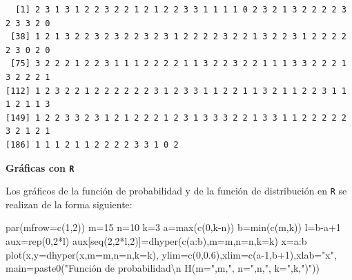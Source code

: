 \documentclass[
  letterpaper,
  DIV=11,
  numbers=noendperiod]{scrreprt}
\newenvironment{Shaded}{\begin{snugshade}}{\end{snugshade}}
\newcommand{\AttributeTok}[1]{\textcolor[rgb]{0.40,0.45,0.13}{#1}}
\newcommand{\DecValTok}[1]{\textcolor[rgb]{0.68,0.00,0.00}{#1}}
\newcommand{\FloatTok}[1]{\textcolor[rgb]{0.68,0.00,0.00}{#1}}
\newcommand{\FunctionTok}[1]{\textcolor[rgb]{0.28,0.35,0.67}{#1}}
\newcommand{\NormalTok}[1]{\textcolor[rgb]{0.00,0.23,0.31}{#1}}
\newcommand{\OtherTok}[1]{\textcolor[rgb]{0.00,0.23,0.31}{#1}}
\newcommand{\SpecialCharTok}[1]{\textcolor[rgb]{0.37,0.37,0.37}{#1}}
\newcommand{\StringTok}[1]{\textcolor[rgb]{0.13,0.47,0.30}{#1}}
\begin{document}
\begin{verbatim}
  [1] 2 3 1 3 1 2 2 3 2 2 1 2 1 2 2 3 3 1 1 1 1 0 2 3 2 1 3 2 2 2 2 3 2 3 3 2 0
 [38] 1 2 1 3 2 2 3 2 3 2 2 3 2 3 1 2 2 2 2 3 2 2 1 3 2 2 3 1 2 2 2 2 2 3 0 2 0
 [75] 3 2 2 2 1 2 2 3 1 1 1 2 2 2 2 1 1 3 2 2 3 2 2 1 1 1 3 3 2 2 2 1 3 2 2 2 1
[112] 1 2 3 2 2 1 2 2 2 2 2 2 3 1 2 3 3 1 1 2 2 1 1 3 2 1 1 2 2 3 1 1 1 2 1 1 3
[149] 1 2 2 3 3 2 3 1 2 1 2 2 2 1 2 3 1 3 3 3 2 2 1 3 3 1 1 2 2 2 2 2 3 2 1 2 1
[186] 1 1 1 2 1 1 2 2 2 2 3 3 1 0 2
\end{verbatim}

\textbf{Gráficas con \texttt{R}}

Los gráficos de la función de probabilidad y de la función de
distribución en \texttt{R} se realizan de la forma siguiente:

\begin{Shaded}
\begin{Highlighting}[]
\FunctionTok{par}\NormalTok{(}\AttributeTok{mfrow=}\FunctionTok{c}\NormalTok{(}\DecValTok{1}\NormalTok{,}\DecValTok{2}\NormalTok{))}
\NormalTok{m}\OtherTok{=}\DecValTok{15}
\NormalTok{n}\OtherTok{=}\DecValTok{10}
\NormalTok{k}\OtherTok{=}\DecValTok{3}
\NormalTok{a}\OtherTok{=}\FunctionTok{max}\NormalTok{(}\FunctionTok{c}\NormalTok{(}\DecValTok{0}\NormalTok{,k}\SpecialCharTok{{-}}\NormalTok{n))}
\NormalTok{b}\OtherTok{=}\FunctionTok{min}\NormalTok{(}\FunctionTok{c}\NormalTok{(m,k))}
\NormalTok{l}\OtherTok{=}\NormalTok{b}\SpecialCharTok{{-}}\NormalTok{a}\SpecialCharTok{+}\DecValTok{1}
\NormalTok{aux}\OtherTok{=}\FunctionTok{rep}\NormalTok{(}\DecValTok{0}\NormalTok{,}\DecValTok{2}\SpecialCharTok{*}\NormalTok{l)}
\NormalTok{aux[}\FunctionTok{seq}\NormalTok{(}\DecValTok{2}\NormalTok{,}\DecValTok{2}\SpecialCharTok{*}\NormalTok{l,}\DecValTok{2}\NormalTok{)]}\OtherTok{=}\FunctionTok{dhyper}\NormalTok{(}\FunctionTok{c}\NormalTok{(a}\SpecialCharTok{:}\NormalTok{b),}\AttributeTok{m=}\NormalTok{m,}\AttributeTok{n=}\NormalTok{n,}\AttributeTok{k=}\NormalTok{k)}
\NormalTok{x}\OtherTok{=}\NormalTok{a}\SpecialCharTok{:}\NormalTok{b}
\FunctionTok{plot}\NormalTok{(x,}\AttributeTok{y=}\FunctionTok{dhyper}\NormalTok{(x,}\AttributeTok{m=}\NormalTok{m,}\AttributeTok{n=}\NormalTok{n,}\AttributeTok{k=}\NormalTok{k),}
  \AttributeTok{ylim=}\FunctionTok{c}\NormalTok{(}\DecValTok{0}\NormalTok{,}\FloatTok{0.6}\NormalTok{),}\AttributeTok{xlim=}\FunctionTok{c}\NormalTok{(a}\DecValTok{{-}1}\NormalTok{,b}\SpecialCharTok{+}\DecValTok{1}\NormalTok{),}\AttributeTok{xlab=}\StringTok{"x"}\NormalTok{,}
  \AttributeTok{main=}\FunctionTok{paste0}\NormalTok{(}\StringTok{"Función de probabilidad}\SpecialCharTok{\textbackslash{}n}\StringTok{ H(m="}\NormalTok{,m,}\StringTok{", n="}\NormalTok{,n,}\StringTok{", k="}\NormalTok{,k,}\StringTok{")"}\NormalTok{))}

\end{Highlighting}
\end{Shaded}
\end{document}
